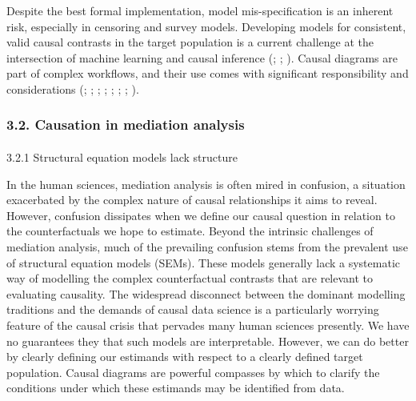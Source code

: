 \documentclass[
  singlecolumn]{article}
\makeatletter
\let\oldparagraph\paragraph
\renewcommand{\paragraph}{
    \@ifstar
      \xxxParagraphStar
      \xxxParagraphNoStar
  }
\newcommand{\xxxParagraphStar}[1]{\oldparagraph*{#1}\mbox{}}
\newcommand{\xxxParagraphNoStar}[1]{\oldparagraph{#1}\mbox{}}
\makeatother
\begin{document}
Despite the best formal implementation, model mis-specification is an
inherent risk, especially in censoring and survey models. Developing
models for consistent, valid causal contrasts in the target population
is a current challenge at the intersection of machine learning and
causal inference (; ;
). Causal
diagrams are part of complex workflows, and their use comes with
significant responsibility and considerations
(;
;
;
;
;
;
;
).

\subsubsection{3.2. Causation in mediation
analysis}\label{causation-in-mediation-analysis}

\paragraph{3.2.1 Structural equation models lack
structure}\label{structural-equation-models-lack-structure}

In the human sciences, mediation analysis is often mired in confusion, a
situation exacerbated by the complex nature of causal relationships it
aims to reveal. However, confusion dissipates when we define our causal
question in relation to the counterfactuals we hope to estimate. Beyond
the intrinsic challenges of mediation analysis, much of the prevailing
confusion stems from the prevalent use of structural equation models
(SEMs). These models generally lack a systematic way of modelling the
complex counterfactual contrasts that are relevant to evaluating
causality. The widespread disconnect between the dominant modelling
traditions and the demands of causal data science is a particularly
worrying feature of the causal crisis that pervades many human sciences
presently. We have no guarantees they that such models are
interpretable. However, we can do better by clearly defining our
estimands with respect to a clearly defined target population. Causal
diagrams are powerful compasses by which to clarify the conditions under
which these estimands may be identified from data.
\end{document}

